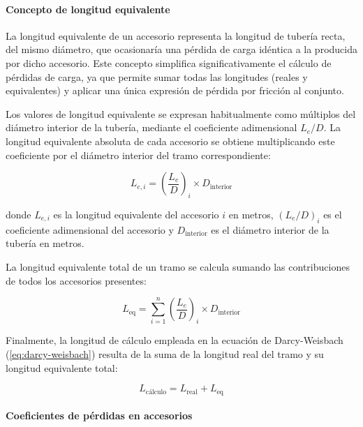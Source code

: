 \documentclass[12pt]{article}
\begin{document}
\paragraph{Concepto de longitud equivalente}

La longitud equivalente de un accesorio representa la longitud de tubería recta, del mismo diámetro, que ocasionaría una pérdida de carga idéntica a la producida por dicho accesorio. Este concepto simplifica significativamente el cálculo de pérdidas de carga, ya que permite sumar todas las longitudes (reales y equivalentes) y aplicar una única expresión de pérdida por fricción al conjunto.

Los valores de longitud equivalente se expresan habitualmente como múltiplos del diámetro interior de la tubería, mediante el coeficiente adimensional $L_e/D$. La longitud equivalente absoluta de cada accesorio se obtiene multiplicando este coeficiente por el diámetro interior del tramo correspondiente:

\begin{equation}
	L_{e,i} = \left(\frac{L_e}{D}\right)_i \times D_{\text{interior}}
	\label{eq:longitud-equivalente-accesorio}
\end{equation}

\noindent donde $L_{e,i}$ es la longitud equivalente del accesorio $i$ en metros, $(L_e/D)_i$ es el coeficiente adimensional del accesorio y $D_{\text{interior}}$ es el diámetro interior de la tubería en metros.

La longitud equivalente total de un tramo se calcula sumando las contribuciones de todos los accesorios presentes:

\begin{equation}
	L_{\text{eq}} = \sum_{i=1}^{n} \left(\frac{L_e}{D}\right)_i \times D_{\text{interior}}
	\label{eq:longitud-equivalente-total}
\end{equation}

Finalmente, la longitud de cálculo empleada en la ecuación de Darcy-Weisbach (\autoref{eq:darcy-weisbach}) resulta de la suma de la longitud real del tramo y su longitud equivalente total:

\begin{equation}
	L_{\text{cálculo}} = L_{\text{real}} + L_{\text{eq}}
	\label{eq:longitud-calculo-total}
\end{equation}

\paragraph{Coeficientes de pérdidas en accesorios}
\end{document}
